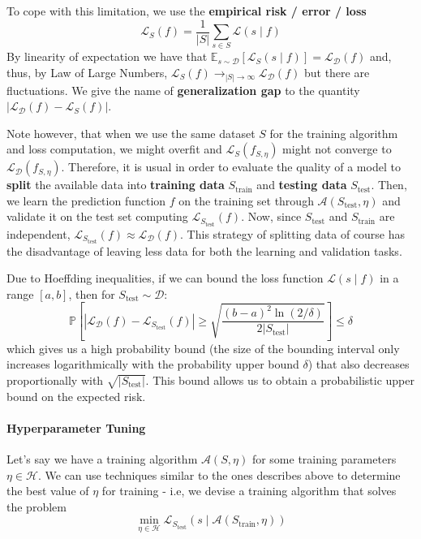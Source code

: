 \documentclass{article}
\newcommand{\prob}{\mathbb{P}}
\newcommand{\E}{\mathbb{E}}
\newcommand{\loss}{\mathcal{L}}
\newcommand{\dist}{\mathcal{D}}
\begin{document}
To cope with this limitation, we use the \textbf{empirical risk / error / loss}
$$
\loss_S(f) = \frac{1}{|S|} \sum_{s \in S} \loss(s \mid f)
$$
By linearity of expectation we have that $\E_{s \sim \dist}\left[\loss_S(s \mid f)\right] = \loss_\dist(f)$ and, thus, by Law of Large Numbers, $\loss_S(f) \to_{|S| \to \infty} \loss_\dist(f)$ but there are fluctuations.
We give the name of \textbf{generalization gap} to the quantity $|\loss_\dist(f) - \loss_S(f)|$.

Note however, that when we use the same dataset $S$ for the training algorithm and loss computation, we might overfit and $\loss_S(f_{S, \eta})$ might not converge to $\loss_\dist(f_{S, \eta})$.
Therefore, it is usual in order to evaluate the quality of a model to \textbf{split} the available data into \textbf{training data} $S_{\text{train}}$ and \textbf{testing data} $S_{\text{test}}$.
Then, we learn the prediction function $f$ on the training set through $\mathcal{A}(S_{\text{test}}, \eta)$ and validate it on the test set computing $\loss_{S_{\text{test}}}(f)$.
Now, since $S_{\text{test}}$ and $S_{\text{train}}$ are independent, $\loss_{S_{\text{test}}}(f) \approx \loss_\dist(f)$.
This strategy of splitting data of course has the disadvantage of leaving less data for both the learning and validation tasks.

Due to Hoeffding inequalities, if we can bound the loss function $\loss(s \mid f)$ in a range $[a, b]$, then for $S_{\text{test}} \sim \dist$:
$$
\prob \left[
    | \loss_\dist(f) - \loss_{S_{\text{test}}}(f) | \geq
    \sqrt{\frac{(b-a)^2 \ln(2/\delta)}{2|S_{\text{test}}|}}
\right] \leq \delta
$$
which gives us a high probability bound (the size of the bounding interval only increases logarithmically with the probability upper bound $\delta$) that also decreases proportionally with $\sqrt{|S_{\text{test}}|}$.
This bound allows us to obtain a probabilistic upper bound on the expected risk.

\paragraph{Hyperparameter Tuning}

Let's say we have a training algorithm $\mathcal{A}(S, \eta)$ for some training parameters $\eta \in \mathcal{H}$.
We can use techniques similar to the ones describes above to determine the best value of $\eta$ for training - i.e, we devise a training algorithm that solves the problem
$$
\min_{\eta \in \mathcal{H}} \loss_{S_{\text{test}}} (s \mid \mathcal{A}(S_{\text{train}}, \eta))
$$
\end{document}
